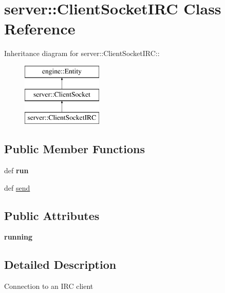 \hypertarget{classserver_1_1ClientSocketIRC}{
\section{server::ClientSocketIRC Class Reference}
\label{classserver_1_1ClientSocketIRC}
}
Inheritance diagram for server::ClientSocketIRC::\begin{figure}[H]
\begin{center}
\leavevmode
\includegraphics[height=3cm]{classserver_1_1ClientSocketIRC}
\end{center}
\end{figure}
\subsection*{Public Member Functions}
\begin{DoxyCompactItemize}
\item 
\hypertarget{classserver_1_1ClientSocketIRC_af0762256297cded13e03ad364cf6f3c4}{
def {\bfseries run}}
\label{classserver_1_1ClientSocketIRC_af0762256297cded13e03ad364cf6f3c4}

\item 
def \hyperlink{classserver_1_1ClientSocketIRC_a513635125e7ae1ef86175971b09b9a0c}{send}
\end{DoxyCompactItemize}
\subsection*{Public Attributes}
\begin{DoxyCompactItemize}
\item 
\hypertarget{classserver_1_1ClientSocketIRC_a7f46a3708e321e40742f4b47f04fb048}{
{\bfseries running}}
\label{classserver_1_1ClientSocketIRC_a7f46a3708e321e40742f4b47f04fb048}

\end{DoxyCompactItemize}


\subsection{Detailed Description}
\begin{DoxyVerb}
Connection to an IRC client
\end{DoxyVerb}
 


